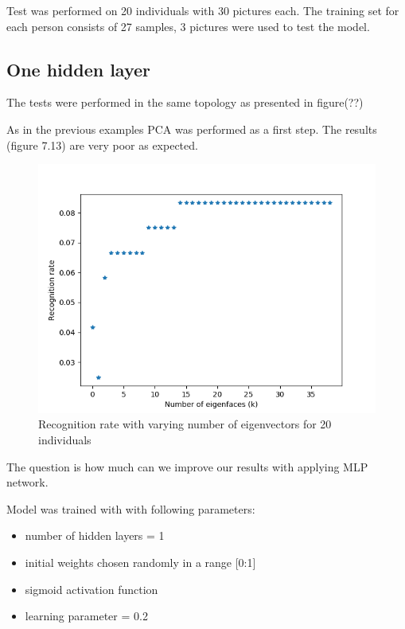 Test was performed on 20 individuals with 30 pictures each. The training set for each person consists of 27 samples, 3 pictures were used to test the model. 

\subsection{One hidden layer}

The tests were performed in the same topology as presented in figure(??)

As in the previous examples PCA was performed as a first step. The results (figure 7.13) are very poor as expected. 

\begin{figure}[H]
\centering
\includegraphics[scale=0.5]{img/tests/lwf/40ppl/PCA.png}
\caption{Recognition rate with varying number of eigenvectors for 20 individuals}
\end{figure} 

The question is how much can we improve our results with applying MLP network.


Model was trained with with following parameters:

\begin{itemize}
\itemsep0em
\item number of hidden layers = 1
\item initial weights chosen randomly in a range [0:1]
\item sigmoid activation function
\item learning parameter = 0.2
\end{itemize}

